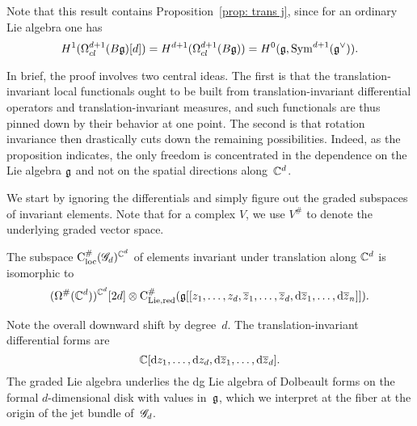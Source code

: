 Note that this result contains Proposition~\ref{prop: trans j}, since for an ordinary Lie algebra one has
\[
H^1( \Omega^{d+1}_{cl}(B \mathfrak g) [d]) = H^{d+1} ( \Omega^{d+1}_{cl}(B \mathfrak g) ) = H^0 (\mathfrak g, {\rm Sym}^{d+1}(\mathfrak g^\vee)) .
\]

In brief, the proof involves two central ideas.
The first is that the translation-invariant local functionals ought to be built from translation-invariant differential operators and translation-invariant measures,
and such functionals are thus pinned down by their behavior at one point.
The second is that rotation invariance then drastically cuts down the remaining possibilities.
Indeed, as the proposition indicates, the only freedom is concentrated in the dependence on the Lie algebra $\mathfrak g$ and not on the spatial directions along~$\mathbb C^d$.

We start by ignoring the differentials and simply figure out the graded subspaces of invariant elements.
Note that for a complex $V$, we use $V^\#$ to denote the underlying graded vector space.

\begin{lem}
The subspace ${\rm C}_{\rm loc}^\#(\mathscr G_d)^{\mathbb C^d}$ of elements invariant under translation along $\mathbb C^d$ is isomorphic to 
\[
(\Omega^\#(\mathbb C^d))^{\mathbb C^d}[2d] \otimes {\rm C}_{\rm Lie, red}^\#(\mathfrak g[[z_1,\ldots,z_d, \overline{z}_1,\ldots, \overline{z}_d, {\rm d}\overline{z}_1,\ldots, {\rm d}\overline{z}_n]]).
\]
\end{lem}

Note the overall downward shift by degree~$d$.
The translation-invariant differential forms are
\[
\mathbb C[{\rm d} z_1,\ldots, {\rm d} z_d, {\rm d} \overline{z}_1,\ldots, {\rm d} \overline{z}_d].
\] 
The graded Lie algebra underlies the dg Lie algebra of Dolbeault forms on the formal $d$-dimensional disk with values in~$\mathfrak g$,
which we interpret at the fiber at the origin of the jet bundle of~$\mathscr G_d$.


